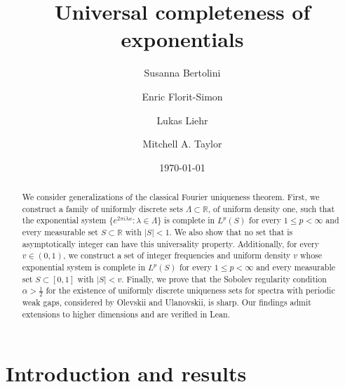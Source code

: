 \documentclass[reqno,a4paper,12pt]{amsart}
\numberwithin{equation}{section}
\newcommand\1{\mathds{1}}
\begin{document}
\title[Universal completeness of exponentials]{Universal completeness of exponentials}

\author[S.~Bertolini]{Susanna Bertolini}
\address{ Department of Mathematics, ETH Z\"urich, Ramistrasse 101, 8092 Z\"urich, Switzerland}

\author[E.~Florit-Simon]{Enric Florit-Simon}
\address{ Department of Mathematics, ETH Z\"urich, Ramistrasse 101, 8092 Z\"urich, Switzerland}

\author[L.~Liehr]{Lukas Liehr}
\address{Department of Mathematics, Bar-Ilan University, Ramat-Gan 5290002, Israel}

\author[M.~Taylor]{Mitchell A. Taylor}
\address{Mathematical Institute, University of Oxford, Andrew Wiles Building, Radcliffe Observatory Quarter, Woodstock Road, Oxford, OX2 6GG, United Kingdom}

\date{\today}

\begin{abstract}
We consider generalizations of the classical Fourier uniqueness theorem. First, we construct a family of uniformly discrete sets $\Lambda \subset \mathbb{R}$, of uniform density one, such that the exponential system $\{e^{2\pi i\lambda x} : \lambda \in \Lambda\}$ is complete in $L^p(S)$ for every $1 \leq p < \infty$ and every measurable set $S \subset \mathbb{R}$ with $|S| < 1$. We also show that no set that is asymptotically integer can have this universality property. Additionally, for every $v \in (0,1)$, we construct a set of integer frequencies and uniform density $v$ whose exponential system is complete in $L^p(S)$ for every $1 \leq p < \infty$ and every measurable set $S \subset [0,1]$ with $|S| < v$.  Finally, we prove that the Sobolev regularity condition $\alpha > \frac12$ for the existence of uniformly discrete uniqueness sets for spectra with periodic weak gaps, considered by Olevskii and Ulanovskii, is sharp. Our findings admit extensions to higher dimensions and are verified in Lean.
\end{abstract}

\maketitle

\section{Introduction and results}\label{sec:intro}
\end{document}
